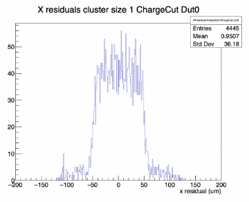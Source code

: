 \begin{figure}[H]
\begin{subfigure}[b]{0.3\textwidth}
        \includegraphics[width=\textwidth]{images/XRes_4pixel_noBin0_size1.png}
        \caption{}
    \end{subfigure}

    \vspace{0.5cm} %


\end{figure}
